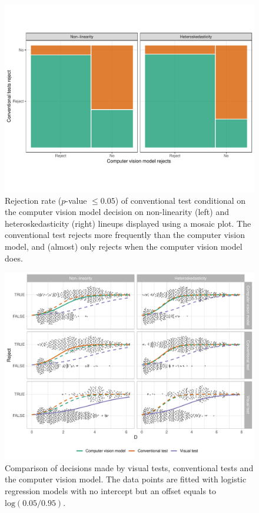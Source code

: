 \documentclass[]{interact}
\theoremstyle{plain}%
\theoremstyle{definition}
\theoremstyle{remark}
\begin{document}
\begin{figure}[!h]

{\centering \includegraphics[width=1\linewidth]{paper_files/figure-latex/conv-mosaic-1} 

}

\caption{Rejection rate ($p$-value $\leq0.05$) of conventional test conditional on the computer vision model decision on non-linearity (left) and heteroskedasticity (right) lineups displayed using a mosaic plot. The conventional test rejects more frequently than the computer vision model, and (almost) only rejects when the computer vision model does.}\label{fig:conv-mosaic}
\end{figure}

\begin{figure}[!h]

{\centering \includegraphics[width=1\linewidth]{paper_files/figure-latex/power-1} 

}

\caption{Comparison of decisions made by visual tests, conventional tests and the computer vision model. The data points are fitted with logistic regression models with no intercept but an offset equals to $\text{log}(0.05/0.95)$.}\label{fig:power}
\end{figure}
\end{document}
